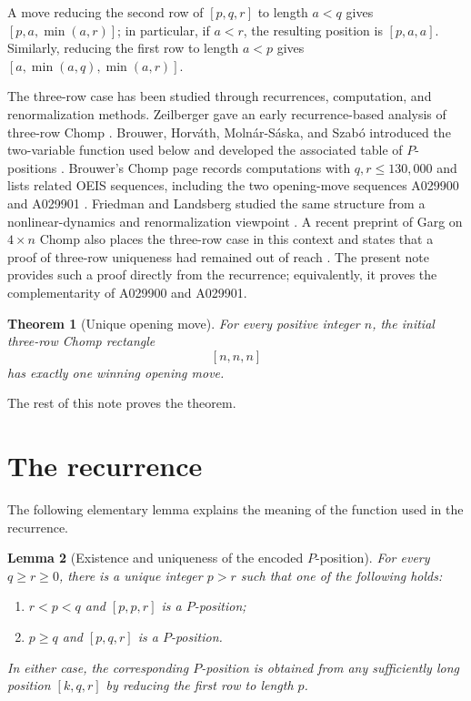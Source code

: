\documentclass[11pt]{article}
\newtheorem{theorem}{Theorem}[section]
\newtheorem{lemma}[theorem]{Lemma}
\begin{document}
A move reducing the second row of $[p,q,r]$ to length $a<q$ gives
$[p,a,\min(a,r)]$; in particular, if $a<r$, the resulting position is
$[p,a,a]$. Similarly, reducing the first row to length $a<p$ gives
$[a,\min(a,q),\min(a,r)]$.

The three-row case has been studied through recurrences, computation, and
renormalization methods. Zeilberger gave an early recurrence-based analysis of
three-row Chomp \cite{Zeilberger2001}. Brouwer, Horv\'ath, Moln\'ar-S\'aska,
and Szab\'o introduced the two-variable function used below and developed the
associated table of $P$-positions \cite{BrouwerEtAl2005}. Brouwer's Chomp
page records computations with $q,r\le 130{,}000$ and lists related OEIS
sequences, including the two opening-move sequences A029900 and A029901
\cite{BrouwerChompPage,OEISA029900,OEISA029901}. Friedman and Landsberg
studied the same structure from a nonlinear-dynamics and renormalization
viewpoint \cite{FriedmanLandsberg2007}. A recent preprint of Garg on
$4\times n$ Chomp also places the three-row case in this context and states
that a proof of three-row uniqueness had remained out of reach
\cite{Garg2026}. The present note provides such a proof directly from the
recurrence; equivalently, it proves the complementarity of A029900 and A029901.

\begin{theorem}[Unique opening move]\label{thm:main}
For every positive integer $n$, the initial three-row Chomp rectangle
\[
        [n,n,n]
\]
has exactly one winning opening move.
\end{theorem}

The rest of this note proves the theorem.

\section{The recurrence}

The following elementary lemma explains the meaning of the function used in
the recurrence.

\begin{lemma}[Existence and uniqueness of the encoded $P$-position]
\label{lem:encodedexistence}
For every $q\ge r\ge 0$, there is a unique integer $p>r$ such that one of the
following holds:
\begin{enumerate}
\item[(i)] $r<p<q$ and $[p,p,r]$ is a $P$-position;
\item[(ii)] $p\ge q$ and $[p,q,r]$ is a $P$-position.
\end{enumerate}
In either case, the corresponding $P$-position is obtained from any sufficiently
long position $[k,q,r]$ by reducing the first row to length $p$.
\end{lemma}
\end{document}
